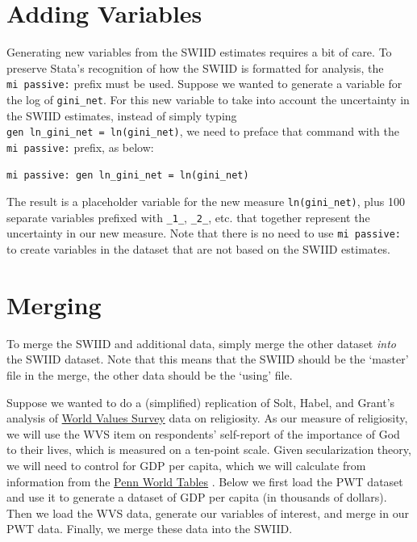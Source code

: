 \documentclass[11pt,]{article}
\theoremstyle{definition}
\theoremstyle{definition}
\theoremstyle{remark}
\begin{document}
\section{Adding Variables}\label{adding-variables}

Generating new variables from the SWIID estimates requires a bit of
care. To preserve Stata's recognition of how the SWIID is formatted for
analysis, the \texttt{mi\ passive:} prefix must be used. Suppose we
wanted to generate a variable for the log of \texttt{gini\_net}. For
this new variable to take into account the uncertainty in the SWIID
estimates, instead of simply typing
\texttt{gen\ ln\_gini\_net\ =\ ln(gini\_net)}, we need to preface that
command with the \texttt{mi\ passive:} prefix, as below:

\begin{verbatim}
mi passive: gen ln_gini_net = ln(gini_net)
\end{verbatim}

The result is a placeholder variable for the new measure
\texttt{ln(gini\_net)}, plus 100 separate variables prefixed with
\texttt{\_1\_}, \texttt{\_2\_}, etc. that together represent the
uncertainty in our new measure. Note that there is no need to use
\texttt{mi\ passive:} to create variables in the dataset that are not
based on the SWIID estimates.

\section{Merging}\label{merging}

To merge the SWIID and additional data, simply merge the other dataset
\emph{into} the SWIID dataset. Note that this means that the SWIID
should be the `master' file in the merge, the other data should be the
`using' file.

Suppose we wanted to do a (simplified) replication of Solt, Habel, and
Grant's analysis \citeyearpar{Solt2011} of
\href{http://worldvaluessurvey.org}{World Values Survey} data on
religiosity. As our measure of religiosity, we will use the WVS item on
respondents' self-report of the importance of God to their lives, which
is measured on a ten-point scale. Given secularization theory, we will
need to control for GDP per capita, which we will calculate from
information from the \href{http://www.ggdc.net/pwt}{Penn World Tables}
\citep{Feenstra2015}. Below we first load the PWT dataset and use it to
generate a dataset of GDP per capita (in thousands of dollars). Then we
load the WVS data, generate our variables of interest, and merge in our
PWT data. Finally, we merge these data into the SWIID.
\end{document}
